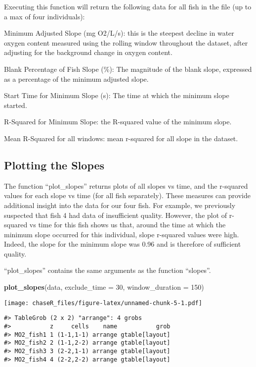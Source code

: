 \documentclass[
]{article}
\newenvironment{Shaded}{\begin{snugshade}}{\end{snugshade}}
\newcommand{\AttributeTok}[1]{\textcolor[rgb]{0.13,0.29,0.53}{#1}}
\newcommand{\DecValTok}[1]{\textcolor[rgb]{0.00,0.00,0.81}{#1}}
\newcommand{\FunctionTok}[1]{\textcolor[rgb]{0.13,0.29,0.53}{\textbf{#1}}}
\newcommand{\NormalTok}[1]{#1}
\begin{document}
Executing this function will return the following data for all fish in
the file (up to a max of four individuals):

Minimum Adjusted Slope (mg O2/L/s): this is the steepest decline in
water oxygen content measured using the rolling window throughout the
dataset, after adjusting for the background change in oxygen content.

Blank Percentage of Fish Slope (\%): The magnitude of the blank slope,
expressed as a percentage of the minimum adjusted slope.

Start Time for Minimum Slope (s): The time at which the minimum slope
started.

R-Squared for Minimum Slope: the R-squared value of the minimum slope.

Mean R-Squared for all windows: mean r-squared for all slope in the
dataset.

\subsection{Plotting the Slopes}\label{plotting-the-slopes}

The function ``plot\_slopes'' returns plots of all slopes vs time, and
the r-squared values for each slope vs time (for all fish separately).
These measures can provide additional insight into the data for our four
fish. For example, we previously suspected that fish 4 had data of
insufficient quality. However, the plot of r-squared vs time for this
fish shows us that, around the time at which the minimum slope occurred
for this individual, slope r-squared values were high. Indeed, the slope
for the minimum slope was 0.96 and is therefore of sufficient quality.

``plot\_slopes'' contains the same arguments as the function ``slopes''.

\begin{Shaded}
\begin{Highlighting}[]
\FunctionTok{plot\_slopes}\NormalTok{(data, }\AttributeTok{exclude\_time =} \DecValTok{30}\NormalTok{, }\AttributeTok{window\_duration =} \DecValTok{150}\NormalTok{)}
\end{Highlighting}
\end{Shaded}

\texttt{[image: chaseR\_files/figure-latex/unnamed-chunk-5-1.pdf]}

\begin{verbatim}
#> TableGrob (2 x 2) "arrange": 4 grobs
#>           z     cells    name           grob
#> MO2_fish1 1 (1-1,1-1) arrange gtable[layout]
#> MO2_fish2 2 (1-1,2-2) arrange gtable[layout]
#> MO2_fish3 3 (2-2,1-1) arrange gtable[layout]
#> MO2_fish4 4 (2-2,2-2) arrange gtable[layout]
\end{verbatim}
\end{document}
